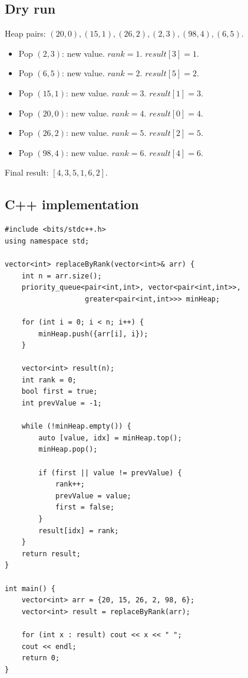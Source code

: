 \subsection*{Dry run}


Heap pairs: $(20,0),(15,1),(26,2),(2,3),(98,4),(6,5)$.

\begin{itemize}
  \item Pop $(2,3)$: new value. $\textit{rank}=1$.
        $\textit{result}[3]=1$.
  \item Pop $(6,5)$: new value. $\textit{rank}=2$.
        $\textit{result}[5]=2$.
  \item Pop $(15,1)$: new value. $\textit{rank}=3$.
        $\textit{result}[1]=3$.
  \item Pop $(20,0)$: new value. $\textit{rank}=4$.
        $\textit{result}[0]=4$.
  \item Pop $(26,2)$: new value. $\textit{rank}=5$.
        $\textit{result}[2]=5$.
  \item Pop $(98,4)$: new value. $\textit{rank}=6$.
        $\textit{result}[4]=6$.
\end{itemize}

Final result: $[4,3,5,1,6,2]$.

\subsection*{C++ implementation}

\begin{lstlisting}
#include <bits/stdc++.h>
using namespace std;

vector<int> replaceByRank(vector<int>& arr) {
    int n = arr.size();
    priority_queue<pair<int,int>, vector<pair<int,int>>,
                   greater<pair<int,int>>> minHeap;

    for (int i = 0; i < n; i++) {
        minHeap.push({arr[i], i});
    }

    vector<int> result(n);
    int rank = 0;
    bool first = true;
    int prevValue = -1;

    while (!minHeap.empty()) {
        auto [value, idx] = minHeap.top();
        minHeap.pop();

        if (first || value != prevValue) {
            rank++;
            prevValue = value;
            first = false;
        }
        result[idx] = rank;
    }
    return result;
}

int main() {
    vector<int> arr = {20, 15, 26, 2, 98, 6};
    vector<int> result = replaceByRank(arr);

    for (int x : result) cout << x << " ";
    cout << endl;
    return 0;
}
\end{lstlisting}

